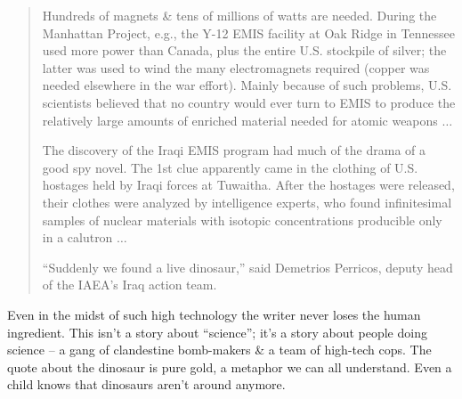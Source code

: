 \documentclass{article}
\begin{document}
\begin{quotation}
	Hundreds of magnets \& tens of millions of watts are needed. During the Manhattan Project, e.g., the Y-12 EMIS facility at Oak Ridge in Tennessee used more power than Canada, plus the entire U.S. stockpile of silver; the latter was used to wind the many electromagnets required (copper was needed elsewhere in the war effort). Mainly because of such problems, U.S. scientists believed that no country would ever turn to EMIS to produce the relatively large amounts of enriched material needed for atomic weapons $\ldots$
	
	The discovery of the Iraqi EMIS program had much of the drama of a good spy novel. The 1st clue apparently came in the clothing of U.S. hostages held by Iraqi forces at Tuwaitha. After the hostages were released, their clothes were analyzed by intelligence experts, who found infinitesimal samples of nuclear materials with isotopic concentrations producible only in a calutron $\ldots$
	
	``Suddenly we found a live dinosaur,'' said Demetrios Perricos, deputy head of the IAEA's Iraq action team.
\end{quotation}
Even in the midst of such high technology the writer never loses the human ingredient. This isn't a story about ``science''; it's a story about people doing science -- a gang of clandestine bomb-makers \& a team of high-tech cops. The quote about the dinosaur is pure gold, a metaphor we can all understand. Even a child knows that dinosaurs aren't around anymore.
\end{document}

